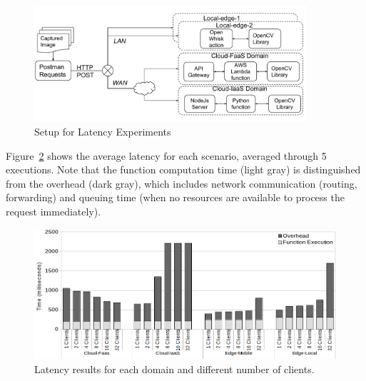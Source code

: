 

\begin{figure}[htb]
	
	\centering
	\includegraphics[width=0.9\textwidth]{figs/experimental-setup.pdf}
	\caption{Setup for Latency Experiments}
	\label{fig:exp-setup1}
\end{figure}


 Figure~\ref{fig:latency-domains} shows the average latency for each scenario, averaged through 5 executions. Note that the function computation time (light gray) is distinguished from the overhead (dark gray), which includes network communication (routing, forwarding) and queuing time (when no resources are available to process the request immediately). 

\begin{figure}
	
	\centering
	\includegraphics[width=1\textwidth]{figs/latency-domains}
	\caption{Latency results for each domain and different number of clients.}
	\label{fig:latency-domains}
\end{figure}

